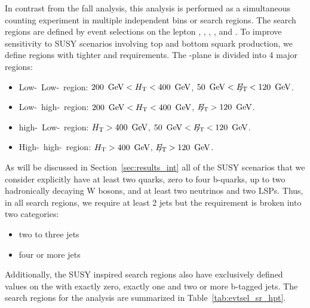 In contrast from the fall analysis, this analysis is performed as a
simultaneous counting experiment in multiple independent bins or search
regions. The search regions are defined by event selections on the lepton
\pt, \Ht, \met, \njets, and \nbtags. To improve sensitivity to SUSY scenarios
involving top and bottom squark production, we define regions with tighter \Ht
and \met requirements. The \met-\Ht plane is divided into 4 major regions:
\begin{itemize}
	\item Low-\Ht~Low-\met~region: $200\ \,\text{Ge\hspace{-.08em}V} < H_{\mathrm{T}} < 400\ \,\text{Ge\hspace{-.08em}V}$, $50\ \GeV < \met < 120\ \GeV$.
	\item Low-\Ht~high-\met~region: $200\ \,\text{Ge\hspace{-.08em}V} < H_{\mathrm{T}} < 400\ \,\text{Ge\hspace{-.08em}V}$, $\met > 120\ \GeV$.
	\item high-\Ht~Low-\met~region: $\Ht > 400\ \GeV$, $50\ \GeV < \met < 120\ \GeV$.
	\item High-\Ht~high-\met~region: $\Ht > 400\ \GeV$, $\met > 120\ \GeV$.
\end{itemize}

As will be discussed in Section~\ref{sec:results_int} all of the SUSY scenarios that we
consider explicitly have at least two quarks, zero to four b-quarks, up to two
hadronically decaying W bosons, and at least two neutrinos and two LSPs. Thus,
in all search regions, we require at least 2 jets but the \njets requirement is
broken into two categories:
\begin{itemize}
\item two to three jets
\item four or more jets 
\end{itemize}
Additionally, the SUSY inspired search regions also have exclusively defined
values on the \nbtags with exactly zero, exactly one and two or more b-tagged
jets.
The search regions for the \hpt analysis are summarized in
Table~\ref{tab:evtsel_sr_hpt}.

